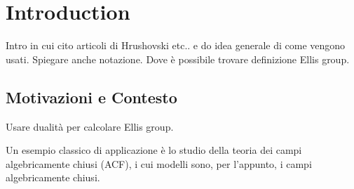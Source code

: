 \documentclass[../main.tex]{subfiles}
\begin{document}
\chapter{Introduction}
\label{ch:intro}

Intro in cui cito articoli di Hrushovski etc.. e do idea generale di come vengono usati. Spiegare anche notazione. Dove è possibile trovare definizione Ellis group.

\section{Motivazioni e Contesto}
\label{sec:motivazioni}

Usare dualità per calcolare Ellis group.

\begin{example}
    Un esempio classico di applicazione è lo studio della teoria dei campi algebricamente chiusi (ACF), i cui modelli sono, per l'appunto, i campi algebricamente chiusi.
\end{example}
\end{document}
